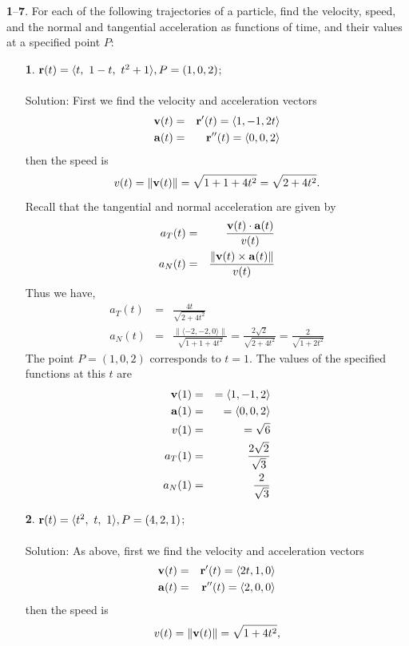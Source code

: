 \documentclass[12pt]{amsbook}
\newcommand{\la}{\langle}
\newcommand{\ra}{\rangle}
\begin{document}
\noindent
{\small {\bf 1}--{\bf 7}}. For each of the following trajectories of a particle, find the velocity,
speed, and the normal and tangential acceleration as functions of time, and their values at a specified point $P$:
\begin{enumerate}
  \item[{\small\bf 1}.] ${\bf r}(t)=\la t,\ 1-t,\ t^2+1 \ra, P=(1,0,2)$;
  \\
  \\
  {\sc Solution}: First we find the velocity and acceleration vectors
  \begin{eqnarray*}
  {\bf v}(t)&=&{\bf r}'(t)=\la 1,-1, 2t \ra\\
  {\bf a}(t)&=&{\bf r}''(t)=\la 0,0,2 \ra 
  \end{eqnarray*}
  then the speed is
  $$v(t)=\|{\bf v}(t)\|=\sqrt{1+1+4t^2}=\sqrt{2+4t^2}.$$
  Recall that the tangential and normal acceleration are given by
  \begin{eqnarray*}
  a_T(t)&=&\frac{{\bf v}(t)\cdot{\bf a}(t)}{v(t)}\\
  a_N(t)&=&\frac{\|{\bf v}(t)\times{\bf a}(t)\|}{v(t)}
\end{eqnarray*}   
Thus we have,
\begin{eqnarray*}
  a_T(t)&=&\frac{4t}{\sqrt{2+4t^2}}\\
  a_N(t)&=&\frac{\|\la -2,-2,0 \ra\|}{\sqrt{1+1+4t^2}}=\frac{2\sqrt{2}}{\sqrt{2+4t^2}}=\frac{2}{\sqrt{1+2t^2}}
\end{eqnarray*}  
The point $P=(1,0,2)$ corresponds to $t=1$. The values of the specified functions at this $t$ are
\begin{eqnarray*}
{\bf v}(1)&=&=\la 1,-1, 2 \ra\\
{\bf a}(1)&=&=\la 0,0,2 \ra \\
v(1)&=&=\sqrt{6}\\
a_T(1)&=&\frac{2\sqrt{2}}{\sqrt{3}}\\
a_N(1)&=&\frac{2}{\sqrt{3}}
\end{eqnarray*}
  \item[{\small\bf 2}.] ${\bf r}(t)=\la t^2,\ t,\ 1 \ra, P=(4,2,1)$;
  \\
  \\
  {\sc Solution}: As above, first we find the velocity and acceleration vectors
  \begin{eqnarray*}
  {\bf v}(t)&=&{\bf r}'(t)=\la 2t,1,0 \ra\\
  {\bf a}(t)&=&{\bf r}''(t)=\la 2,0,0 \ra 
  \end{eqnarray*}
  then the speed is
  $$v(t)=\|{\bf v}(t)\|=\sqrt{1+4t^2},$$

\end{enumerate}
\end{document}
